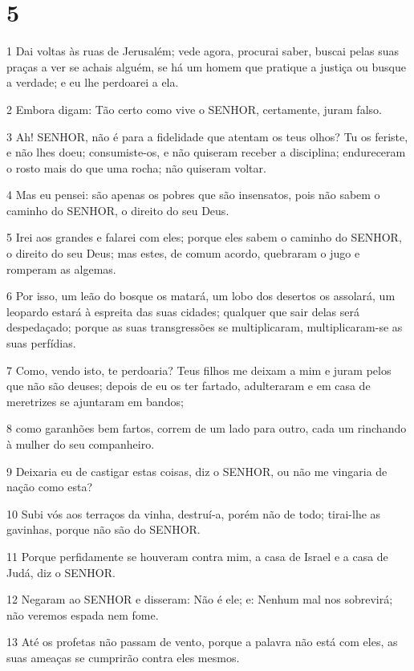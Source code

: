 \chapter{5}

\par 1 Dai voltas às ruas de Jerusalém; vede agora, procurai saber, buscai pelas suas praças a ver se achais alguém, se há um homem que pratique a justiça ou busque a verdade; e eu lhe perdoarei a ela.
\par 2 Embora digam: Tão certo como vive o SENHOR, certamente, juram falso.
\par 3 Ah! SENHOR, não é para a fidelidade que atentam os teus olhos? Tu os feriste, e não lhes doeu; consumiste-os, e não quiseram receber a disciplina; endureceram o rosto mais do que uma rocha; não quiseram voltar.
\par 4 Mas eu pensei: são apenas os pobres que são insensatos, pois não sabem o caminho do SENHOR, o direito do seu Deus.
\par 5 Irei aos grandes e falarei com eles; porque eles sabem o caminho do SENHOR, o direito do seu Deus; mas estes, de comum acordo, quebraram o jugo e romperam as algemas.
\par 6 Por isso, um leão do bosque os matará, um lobo dos desertos os assolará, um leopardo estará à espreita das suas cidades; qualquer que sair delas será despedaçado; porque as suas transgressões se multiplicaram, multiplicaram-se as suas perfídias.
\par 7 Como, vendo isto, te perdoaria? Teus filhos me deixam a mim e juram pelos que não são deuses; depois de eu os ter fartado, adulteraram e em casa de meretrizes se ajuntaram em bandos;
\par 8 como garanhões bem fartos, correm de um lado para outro, cada um rinchando à mulher do seu companheiro.
\par 9 Deixaria eu de castigar estas coisas, diz o SENHOR, ou não me vingaria de nação como esta?
\par 10 Subi vós aos terraços da vinha, destruí-a, porém não de todo; tirai-lhe as gavinhas, porque não são do SENHOR.
\par 11 Porque perfidamente se houveram contra mim, a casa de Israel e a casa de Judá, diz o SENHOR.
\par 12 Negaram ao SENHOR e disseram: Não é ele; e: Nenhum mal nos sobrevirá; não veremos espada nem fome.
\par 13 Até os profetas não passam de vento, porque a palavra não está com eles, as suas ameaças se cumprirão contra eles mesmos.
